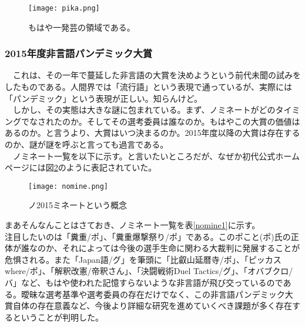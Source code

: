 \begin{figure}[H]
  \centering
  \texttt{[image: pika.png]}
  \caption{もはや一発芸の領域である。}
\label{pika}
\end{figure}

\subsubsection{2015年度非言語パンデミック大賞}
　これは、その一年で蔓延した非言語の大賞を決めようという前代未聞の試みをしたものである。人間界では「流行語」という表現で通っているが、実際には「パンデミック」という表現が正しい。知らんけど。\\
　しかし、その実態は大きな謎に包まれている。まず、ノミネートがどのタイミングでなされたのか。そしてその選考委員は誰なのか。もはやこの大賞の価値はあるのか。と言うより、大賞はいつ決まるのか。2015年度以降の大賞は存在するのか、謎が謎を呼ぶと言っても過言である。\\
　ノミネート一覧を以下に示す。と言いたいところだが、なぜか初代公式ホームページには図\ref{nomine}のように表記されていた。

\begin{figure}[H]
  \centering
  \texttt{[image: nomine.png]}
  \caption{ノ2015ミネートという概念}
\label{nomine}
\end{figure}

まあそんなんことはさておき、ノミネート一覧を表\ref{nomine1}に示す。\\
注目したいのは「糞重/ポ」、「糞重爆撃祭り/ポ」である。このポこと(ポ)氏の正体が誰なのか、それによっては今後の選手生命に関わる大裁判に発展することが危惧される。また「Japan語/グ」を筆頭に「比叡山延暦寺/ポ」、「ピッカス where/ポ」、「解釈改憲/帝釈さん」、「決闘戦術Duel Tactics/グ」、「オバブクロ/バ」など、もはや使われた記憶すらないような非言語が飛び交っているのである。曖昧な選考基準や選考委員の存在だけでなく、この非言語パンデミック大賞自体の存在意義など、今後より詳細な研究を進めていくべき課題が多く存在するということが判明した。

